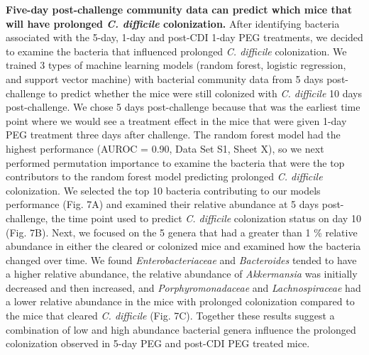 \documentclass[
  11pt,
]{article}
\begin{document}
\textbf{Five-day post-challenge community data can predict which mice
that will have prolonged \emph{C. difficile} colonization.} After
identifying bacteria associated with the 5-day, 1-day and post-CDI 1-day
PEG treatments, we decided to examine the bacteria that influenced
prolonged \emph{C. difficile} colonization. We trained 3 types of
machine learning models (random forest, logistic regression, and support
vector machine) with bacterial community data from 5 days post-challenge
to predict whether the mice were still colonized with \emph{C.
difficile} 10 days post-challenge. We chose 5 days post-challenge
because that was the earliest time point where we would see a treatment
effect in the mice that were given 1-day PEG treatment three days after
challenge. The random forest model had the highest performance (AUROC =
0.90, Data Set S1, Sheet X), so we next performed permutation importance
to examine the bacteria that were the top contributors to the random
forest model predicting prolonged \emph{C. difficile }colonization. We
selected the top 10 bacteria contributing to our models performance
(Fig. 7A) and examined their relative abundance at 5 days
post-challenge, the time point used to predict \emph{C. difficile}
colonization status on day 10 (Fig. 7B). Next, we focused on the 5
genera that had a greater than 1 \% relative abundance in either the
cleared or colonized mice and examined how the bacteria changed over
time. We found \emph{Enterobacteriaceae} and \emph{Bacteroides} tended
to have a higher relative abundance, the relative abundance of
\emph{Akkermansia} was initially decreased and then increased, and
\emph{Porphyromonadaceae} and \emph{Lachnospiraceae} had a lower
relative abundance in the mice with prolonged colonization compared to
the mice that cleared \emph{C. difficile} (Fig. 7C). Together these
results suggest a combination of low and high abundance bacterial genera
influence the prolonged colonization observed in 5-day PEG and post-CDI
PEG treated mice.
\end{document}
